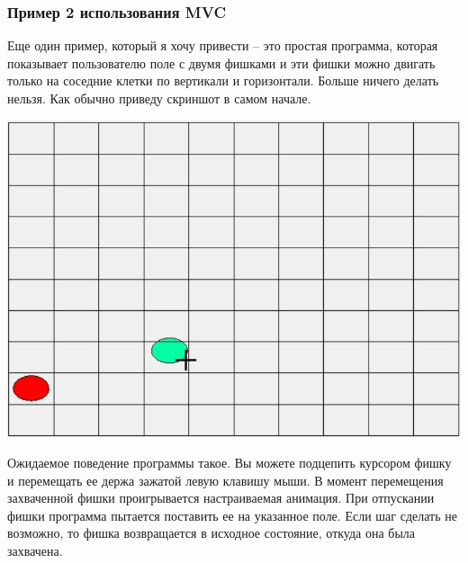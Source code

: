 \subsubsection{Пример 2 использования MVC}
\label{section::MVCExample2}

Еще один пример, который я хочу привести -- это простая программа, которая показывает пользователю поле с двумя фишками и эти фишки можно двигать только на соседние клетки по вертикали и горизонтали.
Больше ничего делать нельзя.
Как обычно приведу скриншот в самом начале.
\begin{center}
\includegraphics[scale=0.6]{Figures/Game1.JPG}
\end{center}
Ожидаемое поведение программы такое.
Вы можете подцепить курсором фишку и перемещать ее держа зажатой левую клавишу мыши.
В момент перемещения захваченной фишки проигрывается настраиваемая анимация.
При отпускании фишки программа пытается поставить ее на указанное поле.
Если шаг сделать не возможно, то фишка возвращается в исходное состояние, откуда она была захвачена.

